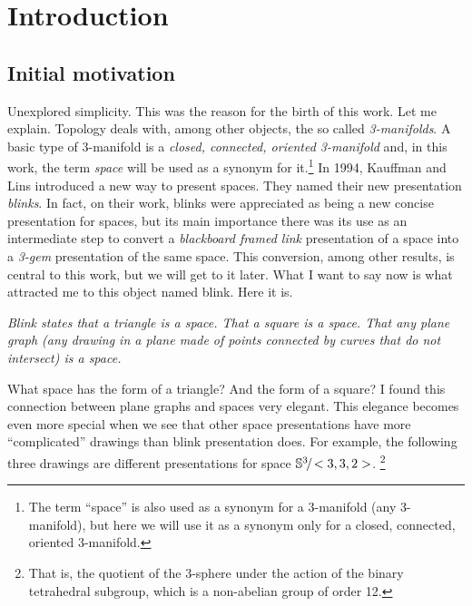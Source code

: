 \chapter{Introduction}

\vspace{-1cm}
\section{Initial motivation}
\label{sec:initialMotivation}

Unexplored simplicity. This was the reason for the birth of this work.
Let me explain. Topology deals with, among other objects, the so
called {\em 3-manifolds}. A basic type of 3-manifold is a {\em
closed, connected, oriented 3-manifold} and, in this work, the term
{\em space} will be used as a synonym for it.\footnote{The term
``space'' is also used as a synonym for a 3-manifold (any
3-manifold), but here we will use it as a synonym only for a closed,
connected, oriented 3-manifold.} In 1994, Kauffman and Lins
\cite{KauffmanAndLins1994} introduced a new way to present spaces.
They named their new presentation {\em blinks}. In fact, on their
work, blinks were appreciated as being a new concise presentation
for spaces, but its main importance there was its use as an
intermediate step to convert a {\em blackboard framed link}
presentation of a space into a {\em 3-gem} presentation of the same
space. This conversion, among other results, is central to this work,
but we will get to it later. What I want to say now is what
attracted me to this object named blink. Here it is.
\vspace{-0.3cm}
{\begin{center} \it
Blink states that a triangle is a space. That a square is a space.
That any plane graph (\ie any drawing in a plane made of
points connected by curves that do not intersect) is a space.
\end{center}}
\vspace{-0.3cm}
\noindent What space has the form of a
triangle? And the form of a square? I found this connection
between plane graphs and spaces very elegant. This elegance
becomes even more special when we see that other space
presentations have more ``complicated'' drawings than
blink presentation does. For example, the following three
drawings are different presentations for space $\mathbb{S}^3\!/\!<3,3,2>$. \footnote{That is, the quotient of the $3$-sphere
under the action of the binary tetrahedral subgroup, which is a non-abelian group of order 12.}
